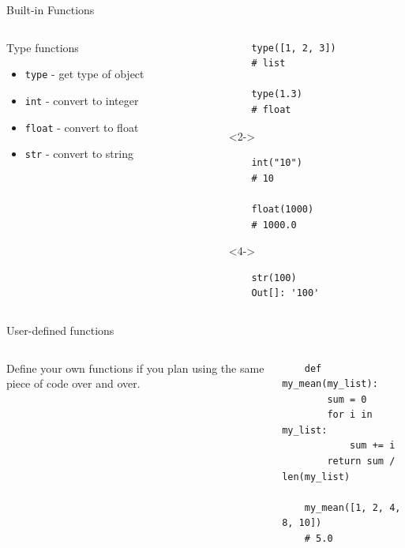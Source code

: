 \documentclass{beamer}
\begin{document}
\begin{frame}[fragile]{Built-in Functions}
    \begin{columns}
        \begin{column}{0.5\textwidth}
            Type functions
            \begin{itemize}[<+->]
                \item \texttt{type} - get type of object
                \item \texttt{int} - convert to integer
                \item \texttt{float} - convert to float
                \item \texttt{str} - convert to string
            \end{itemize}
        \end{column}
        \begin{column}{0.5\textwidth}
        \small
\begin{block}{}
\begin{verbatim}
    type([1, 2, 3])
    # list

    type(1.3)
    # float
\end{verbatim}
\end{block}
\vspace*{-3em}
\begin{block}<2->{}
\begin{verbatim}
    int("10")
    # 10

    float(1000)
    # 1000.0
\end{verbatim}
\end{block}
\vspace*{-3em}
\begin{block}<4->{}
\begin{verbatim}
    str(100)
    Out[]: '100'
\end{verbatim}
\end{block}
        \end{column}
    \end{columns}
\end{frame}

\begin{frame}[fragile]{User-defined functions}
    \begin{columns}
        \begin{column}{0.3\textwidth}
            Define your own functions if you plan using the same piece of code over and over.
        \end{column}
        \begin{column}{0.7\textwidth}
        \small
\begin{block}{}
\begin{verbatim}
    def my_mean(my_list):
        sum = 0
        for i in my_list:
            sum += i
        return sum / len(my_list)

    my_mean([1, 2, 4, 8, 10])
    # 5.0
\end{verbatim}
\end{block}  
        \end{column}
    \end{columns}
\end{frame}
\end{document}
